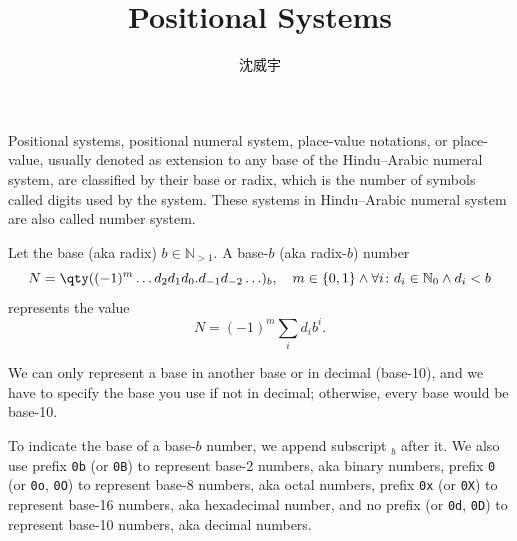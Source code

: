 \documentclass[a4paper,12pt]{article}
\begin{document}
\title{Positional Systems}
\author{沈威宇}
\date{\temtoday}
\titletocdoc
{}
Positional systems, positional numeral system, place-value notations, or place-value, usually denoted as extension to any base of the Hindu–Arabic numeral system, are classified by their base or radix, which is the number of symbols called digits used by the system. These systems in Hindu–Arabic numeral system are also called number system.

Let the base (aka radix) $b\in\mathbb{N}_{>1}$. A base-$b$ (aka radix-$b$) number
\[N=\qty((-1)^m\ldots d_2d_1d_0.d_{-1}d_{-2}\ldots)_b,\quad m\in\{0,1\}\land\forall i\colon d_i\in\mathbb{N}_0\land d_i<b\]
represents the value
\[N =(-1)^m\sum_id_ib^i.\]

We can only represent a base in another base or in decimal (base-10), and we have to specify the base you use if not in decimal; otherwise, every base would be base-10.

To indicate the base of a base-$b$ number, we append subscript $_b$ after it. We also use prefix \verb|0b| (or \verb|0B|) to represent base-2 numbers, aka binary numbers, prefix \verb|0| (or \verb|0o|, \verb|0O|) to represent base-8 numbers, aka octal numbers, prefix \verb|0x| (or \verb|0X|) to represent base-16 numbers, aka hexadecimal number, and no prefix (or \verb|0d|, \verb|0D|) to represent base-10 numbers, aka decimal numbers.
\end{document}
